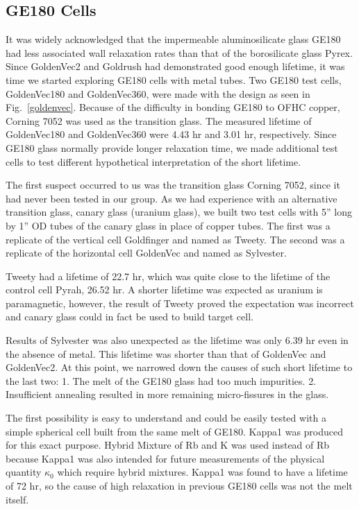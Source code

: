\subsection{GE180 Cells}

It was widely acknowledged that the impermeable aluminosilicate glass GE180 had less associated wall relaxation rates than that of the borosilicate glass Pyrex. Since GoldenVec2 and Goldrush had demonstrated good enough lifetime, it was time we started exploring GE180 cells with metal tubes. Two GE180 test cells, GoldenVec180 and GoldenVec360, were made with the design as seen in Fig.~\ref{goldenvec}. Because of the difficulty in bonding GE180 to OFHC copper, Corning 7052 was used as the transition glass. The measured lifetime of GoldenVec180 and GoldenVec360 were 4.43 hr and 3.01 hr, respectively. Since GE180 glass normally provide longer relaxation time, we made additional test cells to test different hypothetical interpretation of the short lifetime.

The first suspect occurred to us was the transition glass Corning 7052, since it had never been tested in our group. As we had experience with an alternative transition glass, canary glass (uranium glass), we built two test cells with 5'' long by 1'' OD  tubes of the canary glass in place of copper tubes. The first was a replicate of the vertical cell Goldfinger and named as Tweety. The second was a replicate of the horizontal cell GoldenVec and named as Sylvester.

Tweety had a lifetime of 22.7 hr, which was quite close to the lifetime of the control cell Pyrah, 26.52 hr. A shorter lifetime was expected as uranium is paramagnetic, however, the result of Tweety proved the expectation was incorrect and canary glass could in fact be used to build target cell.

Results of Sylvester was also unexpected as the lifetime was only 6.39 hr even in the absence of metal. This lifetime was shorter than that of GoldenVec and GoldenVec2. At this point, we narrowed down the causes of such short lifetime to the last two:
1. The melt of the GE180 glass had too much impurities.
2. Insufficient annealing resulted in more remaining micro-fissures in the glass.

The first possibility is easy to understand and could be easily tested with a simple spherical cell built from the same melt of GE180. Kappa1 was produced for this exact purpose. Hybrid Mixture of Rb and K was used instead of Rb because Kappa1 was also intended for future measurements of the physical quantity $\kappa_0$ which require hybrid mixtures. Kappa1 was found to have a lifetime of 72 hr, so the cause of high relaxation in previous GE180 cells was not the melt itself.

